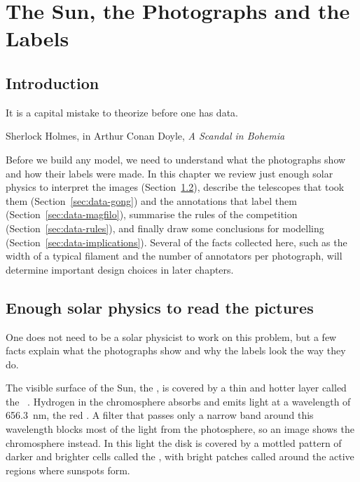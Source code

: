 \chapter{The Sun, the Photographs and the Labels}\label{ch:data}

\section{Introduction}\label{sec:data-intro}
\epigraph{It is a capital mistake to theorize before one has data.}{Sherlock Holmes, in Arthur
Conan Doyle, \emph{A Scandal in Bohemia} \citeyearpar{doyle1891}}

Before we build any model, we need to understand what the photographs show and how their labels
were made. In this chapter we review just enough solar physics to interpret the images
(Section~\ref{sec:data-sun}), describe the telescopes that took them
(Section~\ref{sec:data-gong}) and the annotations that label them
(Section~\ref{sec:data-magfilo}), summarise the rules of the competition
(Section~\ref{sec:data-rules}), and finally draw some conclusions for modelling
(Section~\ref{sec:data-implications}). Several of the facts collected here, such as the width of
a typical filament and the number of annotators per photograph, will determine important design
choices in later chapters.

\section{Enough solar physics to read the pictures}\label{sec:data-sun}
One does not need to be a solar physicist to work on this problem, but a few facts explain what
the photographs show and why the labels look the way they do.

The visible surface of the Sun, the , is covered by a thin and hotter layer
called the ~\citep{stix2002}. Hydrogen in the chromosphere absorbs and emits light at a
wavelength of 656.3~nm, the red . A filter that passes only a narrow band
around this wavelength blocks most of the light from the photosphere, so an \Ha{} image shows the
chromosphere instead. In this light the disk is covered by a mottled pattern of darker and
brighter cells called the , with bright patches called
 around the active regions where sunspots form.

